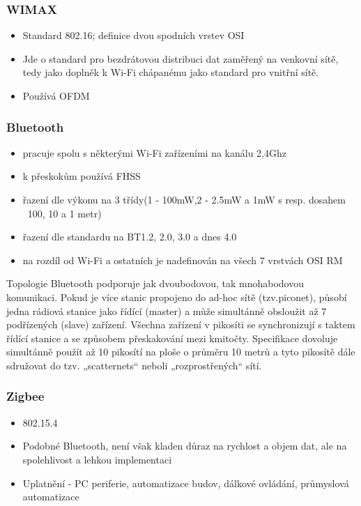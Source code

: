 \documentclass[10pt,a4paper]{article}
\begin{document}
\subsubsection{WIMAX}
\begin{itemize}
\item Standard 802.16; definice dvou spodních vrstev OSI
\item Jde o standard pro bezdrátovou distribuci dat zaměřený na venkovní sítě, tedy jako doplněk k Wi-Fi chápanému jako standard pro vnitřní sítě.
\item Používá OFDM
\end{itemize}

\subsubsection{Bluetooth}
\begin{itemize}
\item pracuje spolu s některými Wi-Fi zařízeními na kanálu 2,4Ghz
\item k přeskokům používá FHSS
\item řazení dle výkonu na 3 třídy(1 - 100mW,2 - 2.5mW a 1mW s resp. dosahem ~100, 10 a 1 metr)
\item řazení dle standardu na BT1.2, 2.0, 3.0 a dnes 4.0
\item na rozdíl od Wi-Fi a ostatních je nadefinován na všech 7 vrstvách OSI RM
\end{itemize}

Topologie
Bluetooth podporuje jak dvoubodovou, tak mnohabodovou komunikaci. Pokud je více stanic propojeno do ad-hoc sítě (tzv.piconet), působí jedna rádiová stanice jako řídící (master) a může simultánně obsloužit až 7 podřízených (slave) zařízení. Všechna zařízení v pikosíti se synchronizují s taktem řídící stanice a se způsobem přeskakování mezi kmitočty. Specifikace dovoluje simultánně použít až 10 pikosítí na ploše o průměru 10 metrů a tyto pikosítě dále sdružovat do tzv. „scatternets“ neboli „rozprostřených“ sítí.
\subsubsection{Zigbee}
\begin{itemize}
\item 802.15.4
\item Podobné Bluetooth, není však kladen důraz na rychlost a objem dat, ale na spolehlivost a lehkou implementaci
\item Uplatnění - PC periferie, automatizace budov, dálkové ovládání, průmyslová automatizace
\end{itemize}
\end{document}
